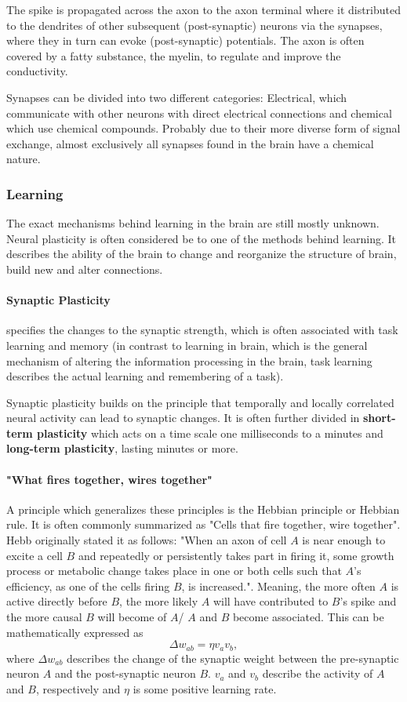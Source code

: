 The spike is propagated across the axon to the axon terminal where it distributed to the dendrites of other subsequent (post-synaptic) neurons via the synapses, where they in turn can evoke (post-synaptic) potentials.
The axon is often covered by a fatty substance, the myelin, to regulate and improve the conductivity.

Synapses can be divided into two different categories: Electrical, which communicate with other neurons with direct electrical connections and chemical which use chemical compounds.
Probably due to their more diverse form of signal exchange, almost exclusively all synapses found in the brain have a chemical nature.

\subsubsection{Learning}

The exact mechanisms behind learning in the brain are still mostly unknown.
Neural plasticity is often considered be to one of the methods behind learning. 
It describes the ability of the brain to change and reorganize the structure of brain, build new and alter connections.  

\paragraph{Synaptic Plasticity} specifies the changes to the synaptic strength, which is often associated with task learning and memory (in contrast to learning in brain, which is the general mechanism of altering the information processing in the brain, task learning describes the actual learning and remembering of a task). 

Synaptic plasticity builds on the principle that temporally and locally correlated neural activity  can lead to synaptic changes.
It is often further divided in \textbf{short-term plasticity} which acts on a time scale one milliseconds to a minutes and \textbf{long-term plasticity}, lasting minutes or more.


\paragraph{"What fires together, wires together"} A principle which generalizes these principles is the Hebbian principle or Hebbian rule.
It is often commonly summarized as "Cells that fire together, wire together".
Hebb originally stated it as follows: "When an axon of cell $A$ is near enough to excite a cell $B$ and repeatedly or persistently takes part in firing it, some growth process or metabolic change takes place in one or both cells such that $A$'s efficiency, as one of the cells firing $B$, is increased.".
Meaning, the more often $A$ is active directly before $B$, the more likely $A$ will have contributed to $B$'s spike and the more causal $B$ will become of $A$/ $A$ and $B$ become associated.
This can be mathematically expressed as
\[
\Delta w_{ab} = \eta v_a v_b ,
\]
where $\Delta w_{ab}$ describes the change of the synaptic weight between the pre-synaptic neuron $A$ and the post-synaptic neuron $B$. 
$v_a$ and $v_b$ describe the activity of $A$ and $B$, respectively and $\eta$ is some positive learning rate. 

